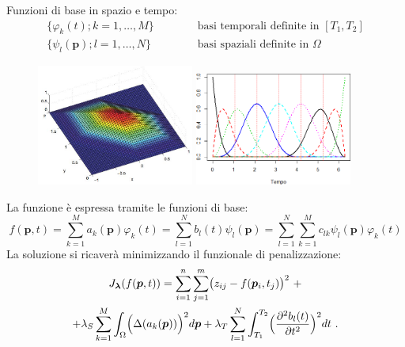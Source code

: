 \documentclass[landscape,9pt]{beamer}                           %
\begin{document}
\begin{frame}
Funzioni di base in spazio e tempo:
\begin{eqnarray*}
\{ \varphi_k(t);k = 1, \ldots , M \} &\qquad & \mbox{ basi temporali definite in } [T_1,T_2] \\
\{ \psi_l(\bm{p});l = 1, \ldots , N \} &\qquad & \mbox{ basi spaziali definite in } \Omega
\end{eqnarray*}
\begin{figure}[t]
	\centering
	\subfigure
	{
	\includegraphics[width=0.46\textwidth]{Immagini/elementofinito.jpg}  
   }
	\subfigure
   {
	\includegraphics[width=0.46\textwidth]{Immagini/Bsplines.png}
   }
\end{figure}
\end{frame}

\begin{frame}
La funzione è espressa tramite le funzioni di base:
$$
f(\bm{p}, t) = \sum_{k=1}^M a_k(\bm{p})\varphi_k(t) = \sum_{l=1}^N b_l(t)\psi_l(\bm{p}) = \sum_{l=1}^N \sum_{k=1}^M c_{lk}\psi_l(\bm{p})\varphi_k(t)
$$
La soluzione si ricaverà minimizzando il funzionale di penalizzazione:
\begin{multline*}
J_{\bm \lambda }(f(\bm p,t))=\sum_{i=1}^n \sum_{j=1}^m \bigl( z_{ij} - f(\bm p_i,t_j) \bigr)^2 \ + \\
+\lambda_S  \sum_{k=1}^M \int_{\Omega} \Bigl( \Delta(  a_k(\bm p)  ) \Bigr)^2 d \bm p + \lambda_T \sum_{l=1}^N\int_{T_1}^{T_2} \Bigl( \frac{\partial^2   b_l(t)   }{\partial t ^2} \Bigr)^2 dt \ .
\end{multline*}
\end{frame}
\end{document}
